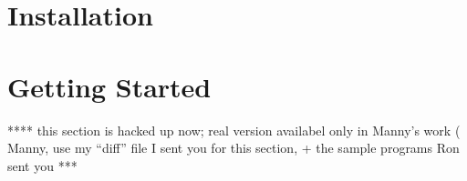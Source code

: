 \documentclass[11pt]{article}
\begin{document}
%
%
% 
%
%

\section{Installation}

\section{ Getting Started }

**** this section is hacked up now; real version availabel only in Manny's work
     ( Manny, use my ``diff'' file I sent you for this section, + the
     sample programs Ron sent you ***
\end{document}
